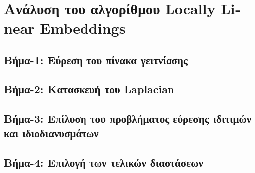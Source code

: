 

\chapter{Ανάλυση του αλγορίθμου \textlatin{Locally Linear Embeddings}}

\section{Βήμα-1: Εύρεση του πίνακα γειτνίασης}

\section{Βήμα-2: Κατασκευή του \textlatin{Laplacian}}

\section{Βήμα-3: Επίλυση του προβλήματος εύρεσης ιδιτιμών και ιδιοδιανυσμάτων}

\section{Βήμα-4: Επιλογή των τελικών διαστάσεων}

